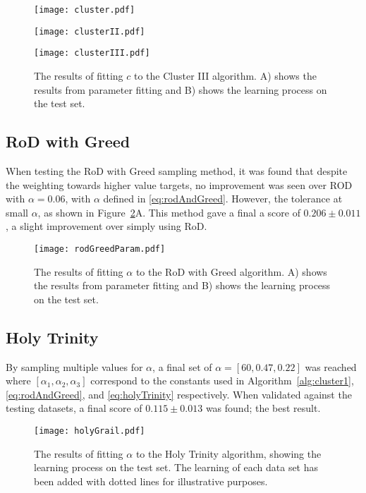 \begin{figure}[H]
    \begin{center}
        \texttt{[image: cluster.pdf]}
    \end{center}
\end{figure}
\begin{figure}[H]
    \begin{center}
        \texttt{[image: clusterII.pdf]}
    \end{center}
\end{figure}
\begin{figure}[H]
    \begin{center}
        \texttt{[image: clusterIII.pdf]}
        \caption[Cluster III]{The results of fitting $c$ to the Cluster III algorithm. A) shows the results from parameter fitting and B) shows the learning process on the test set.}
        \label{fig:clusterTest}
    \end{center}
\end{figure}

\subsection{RoD with Greed}
When testing the RoD with Greed sampling method, it was found that despite the weighting towards higher value targets, no improvement was seen over ROD with $\alpha{}=0.06$, with $\alpha$ defined in \ref{eq:rodAndGreed}. However, the tolerance at small $\alpha$, as shown in Figure~\ref{fig:rogreed}A. This method gave a final a score of ${0.206\pm{}0.011}$, a slight improvement over simply using RoD.

\begin{figure}[H]
    \begin{center}
        \texttt{[image: rodGreedParam.pdf]}
        \caption[RoD with Greed]{The results of fitting $\alpha{}$ to the RoD with Greed algorithm. A) shows the results from parameter fitting and B) shows the learning process on the test set.}
        \label{fig:rogreed}
    \end{center}
\end{figure}

\subsection{Holy Trinity}
By sampling multiple values for $\alpha$, a final set of $\alpha=[60, 0.47, 0.22]$ was reached where $[\alpha{}_1, \alpha{}_2, \alpha{}_3]$ correspond to the constants used in Algorithm~\ref{alg:cluster1}, \ref{eq:rodAndGreed}, and \ref{eq:holyTrinity} respectively. When validated against the testing datasets, a final score of $0.115\pm{}0.013$ was found; the best result.

\begin{figure}[H]
    \begin{center}
        \texttt{[image: holyGrail.pdf]}
        \caption[Holy Trinity]{The results of fitting $\alpha{}$ to the Holy Trinity algorithm, showing the learning process on the test set. The learning of each data set has been added with dotted lines for illustrative purposes.}
        \label{fig:holyTrinity}
    \end{center}
\end{figure}

